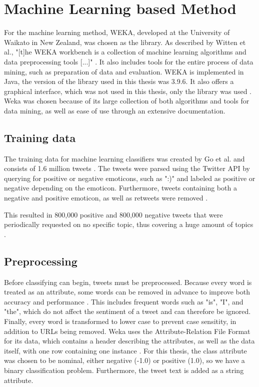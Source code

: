 \section{Machine Learning based Method}

For the machine learning method, WEKA, developed at the University of Waikato in New Zealand, was chosen as the library. As described by Witten et al., "[t]he WEKA workbench is a collection of machine learning algorithms and data preprocessing tools [...]" \cite[p.~7]{weka}. It also includes tools for the entire process of data mining, such as preparation of data and evaluation. WEKA is implemented in Java, the version of the library used in this thesis was 3.9.6. It also offers a graphical interface, which was not used in this thesis, only the library was used \cite{weka}. Weka was chosen because of its large collection of both algorithms and tools for data mining, as well as ease of use through an extensive documentation.

\subsection{Training data}
The training data for machine learning classifiers was created by Go et al. and consists of 1.6 million tweets \cite{GoBHaHua2009}. The tweets were parsed using the Twitter API by querying for positive or negative emoticons, such as ":)" and labeled as positive or negative depending on the emoticon. Furthermore, tweets containing both a negative and positive emoticon, as well as retweets were removed \cite{GoBHaHua2009}.

This resulted in 800,000 positive and 800,000 negative tweets that were periodically requested on no specific topic, thus covering a huge amount of topics \cite{GoBHaHua2009}.
\subsection{Preprocessing}
Before classifying can begin, tweets must be preprocessed. Because every word is treated as an attribute, some words can be removed in advance to improve both accuracy and performance . This includes frequent words such as "is", "I", and "the", which do not affect the sentiment of a tweet and can therefore be ignored. Finally, every word is transformed to lower case to prevent case sensitity, in addition to URLs being removed. Weka uses the Attribute-Relation File Format for its data, which contains a header describing the attributes, as well as the data itself, with one row containing one instance \cite{weka}. For this thesis, the class attribute was chosen to be nominal, either negative (-1.0) or positive (1.0), so we have a binary classification problem. Furthermore, the tweet text is added as a string attribute.

